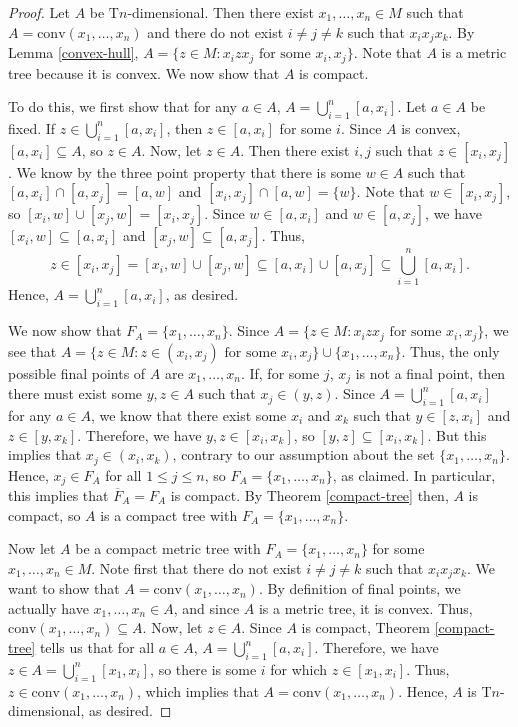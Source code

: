 \documentclass{bcp92}
\theoremstyle{plain}
\theoremstyle{definition}
\begin{document}
\begin{proof}
Let $A$ be T$n$-dimensional. Then there exist $x_1, \dots, x_{n} \in M$ such
that $A = \text{conv}(x_1, \dots, x_{n})$ and there do not exist $i \neq j
\neq k$ such that $x_i x_j x_k$. By Lemma \ref{convex-hull}, $A = \{ z \in M
: x_i z x_j \text{ for some } x_i,x_j \}$. Note that $A$ is a metric tree
because it is convex. We now show that $A$ is compact.

To do this, we first show that for any $a \in A$, $ A =
\bigcup_{i=1}^{n}{[a,x_i]}$. Let $a \in A$ be fixed. If $z \in
\bigcup_{i=1}^{n}{[a,x_i]}$, then $z \in [a,x_i]$ for some $i$. Since $A$ is
convex, $[a,x_i] \subseteq A$, so $z \in A$. Now, let $z \in A$. Then there
exist $i,j$ such that $z \in [x_i,x_j]$. We know by the three point property
that there is some $w \in A$ such that $[a,x_i] \cap [a,x_j] = [a,w]$ and
$[x_i,x_j] \cap [a,w] = \{ w \}$. Note that $w \in [x_i,x_j]$, so $[x_i,w]
\cup [x_j,w] = [x_i,x_j]$. Since $w \in [a,x_i]$ and $w \in [a,x_j]$, we have
$[x_i,w] \subseteq [a,x_i]$ and $[x_j,w] \subseteq [a,x_j]$. Thus,
$$
z \in [x_i,x_j] = [x_i,w] \cup [x_j,w] \subseteq [a,x_i] \cup [a,x_j]
\subseteq \bigcup_{i=1}^{n}{[a,x_i]}.
$$
Hence, $A = \bigcup_{i=1}^{n}{[a,x_i]}$, as desired.

We now show that $F_A = \{ x_1, \dots, x_{n} \}$. Since $A = \{ z \in M : x_i
z x_j \text{ for some } x_i,x_j \}$, we see that $A = \{ z \in M : z \in
(x_i,x_j) \text{ for some } x_i,x_j \} \cup \{ x_1, \dots, x_{n} \}$. Thus,
the only possible final points of $A$ are $x_1, \dots, x_{n}$. If, for some
$j$, $x_j$ is not a final point, then there must exist some $y,z \in A$ such
that $x_j \in (y,z)$. Since $ A = \bigcup_{i=1}^{n}{[a,x_i]} $ for any $a \in
A$, we know that there exist some $x_i$ and $x_k$ such that $y \in [z,x_i]$
and $z \in [y,x_k]$. Therefore, we have $y,z \in [x_i,x_k]$, so $[y,z]
\subseteq [x_i,x_k]$. But this implies that $x_j \in (x_i,x_k)$, contrary to
our assumption about the set $\{ x_1, \dots, x_{n} \}$. Hence, $x_j \in F_A$
for all $1 \leq j \leq n$, so $F_A = \{ x_1, \dots, x_{n} \}$, as claimed. In
particular, this implies that $\overline{F}_A = F_A$ is compact. By Theorem
\ref{compact-tree} then, $A$ is compact, so $A$ is a compact tree with $F_A =
\{ x_1, \dots, x_{n} \}$.

Now let $A$ be a compact metric tree with $F_A = \{ x_1, \dots, x_{n} \}$ for
some $x_1, \dots, x_{n} \in M$. Note first that there do not exist $i \neq j
\neq k$ such that $x_i x_j x_k$. We want to show that $A = \text{conv}(x_1,
\dots, x_{n})$. By definition of final points, we actually have $x_1, \dots,
x_{n} \in A$, and since $A$ is a metric tree, it is convex. Thus,
$\text{conv}(x_1, \dots, x_{n}) \subseteq A$. Now, let $z \in A$. Since $A$
is compact, Theorem \ref{compact-tree} tells us that for all $a \in A$, $ A =
\bigcup_{i=1}^{n}{[a,x_i]}$. Therefore, we have $ z \in A =
\bigcup_{i=1}^{n}{[x_1,x_i]}$, so there is some $i$ for which $z \in
[x_1,x_i]$. Thus, $z \in \text{conv}(x_1, \dots, x_{n})$, which implies that
$A = \text{conv}(x_1, \dots, x_{n})$. Hence, $A$ is T$n$-dimensional, as
desired.
\end{proof}
\end{document}
